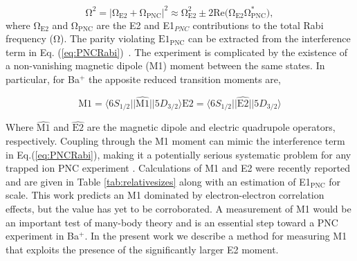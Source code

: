 \documentclass[%
 reprint,
 amsmath,amssymb,
 aps,
]{revtex4-1}
\begin{document}
\begin{equation}\label{eq:PNCRabi}
\mathrm{\Omega}^{2} = \big| \mathrm{\Omega_{E2}} + \mathrm{\Omega_{\mathrm{PNC}}} \big|^{2} \approx \mathrm{\Omega^{2}_{E2}} \pm 
2 \mathrm{Re}\big( \mathrm{\Omega_{E2}}\mathrm{\Omega^{*}_{PNC}} \big),
\end{equation} 
\noindent where $\mathrm{\Omega_{E2}}$ and $\mathrm{\Omega_{PNC}}$ are the E2 and E1$_{PNC}$ contributions to the total Rabi frequency ($\mathrm{\Omega}$). The parity violating $\mathrm{E1_{PNC}}$ can be extracted from the interference term in Eq. (\ref{eq:PNCRabi}) \,.    
The experiment is complicated by the existence of a non-vanishing magnetic dipole (M1) moment between the same states. In particular, for Ba$^{+}$  the apposite reduced transition moments are,

\begin{subequations}\label{eq:M1E2}
\begin{equation}
\mathrm{M1} = \big\langle 6S_{1/2} \big|\big| \widehat{\mathrm{M1}} \big|\big| 5D_{3/2} \big\rangle
\end{equation}
\begin{equation}
\mathrm{E2} = \big\langle 6S_{1/2} \big|\big| \widehat{\mathrm{E2}} \big|\big| 5D_{3/2} \big\rangle
\end{equation}
\end{subequations}

\noindent Where $\widehat{\mathrm{M1}}$ and $\widehat{\mathrm{E2}}$ are the magnetic dipole and electric quadrupole operators, respectively.  Coupling through the M1 moment can mimic the interference term in Eq.(\ref{eq:PNCRabi}), making it a potentially serious systematic problem for any trapped ion PNC experiment \cite{Mandal10}.  Calculations of M1 and E2 were recently reported \cite{Sahoo06} and are given in Table \ref{tab:relativesizes} along with an estimation of E1$\mathrm{_{PNC}}$ for scale.  This work predicts an M1 dominated by electron-electron correlation effects, but the value has yet to be corroborated.  A measurement of M1 would be an important test of many-body theory and is an essential step toward a PNC experiment in Ba$^{+}$.  In the present work we describe a method for measuring M1 that exploits the presence of the significantly larger E2 moment. \\
\end{document}
